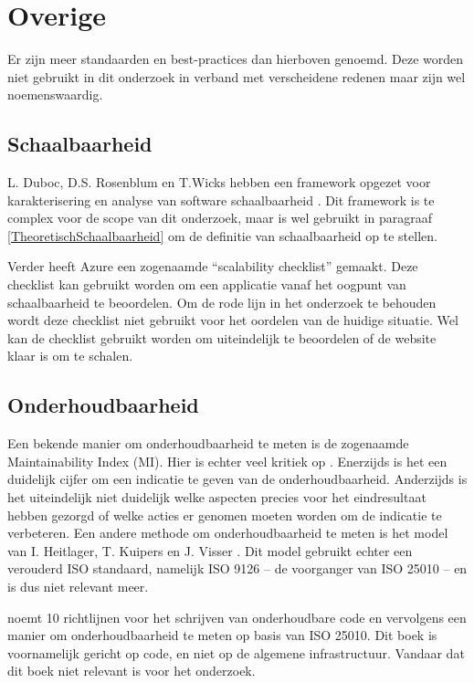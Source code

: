\section{Overige}

Er zijn meer standaarden en best-practices dan hierboven genoemd. Deze worden niet gebruikt in dit onderzoek in verband met verscheidene redenen maar zijn wel noemenswaardig.

\subsection{Schaalbaarheid}
L. Duboc, D.S. Rosenblum en T.Wicks hebben een framework opgezet voor karakterisering en analyse van software schaalbaarheid \parencite{ScalabilityFramework}. Dit framework is te complex voor de scope van dit onderzoek, maar is wel gebruikt in paragraaf \ref{TheoretischSchaalbaarheid} om de definitie van schaalbaarheid op te stellen.

Verder heeft Azure \parencite{AzureScalability} een zogenaamde \enquote{scalability checklist} gemaakt. Deze checklist kan gebruikt worden om een applicatie vanaf het oogpunt van schaalbaarheid te beoordelen. Om de rode lijn in het onderzoek te behouden wordt deze checklist niet gebruikt voor het oordelen van de huidige situatie. Wel kan de checklist gebruikt worden om uiteindelijk te beoordelen of de website klaar is om te schalen.

\subsection{Onderhoudbaarheid}
Een bekende manier om onderhoudbaarheid te meten is de zogenaamde Maintainability Index (MI). Hier is echter veel kritiek op \parencite{MaintainabilityLiteratureReview, WhyNoMI, WhyNoMI2, MeasuringMaintainability}. Enerzijds is het een duidelijk cijfer om een indicatie te geven van de onderhoudbaarheid. Anderzijds is het uiteindelijk niet duidelijk welke aspecten precies voor het eindresultaat hebben gezorgd of welke acties er genomen moeten worden om de indicatie te verbeteren. Een andere methode om onderhoudbaarheid te meten is het model van I. Heitlager, T. Kuipers en J. Visser \parencite{MeasuringMaintainability}. Dit model gebruikt echter een verouderd ISO standaard, namelijk ISO 9126 -- de voorganger van ISO 25010 -- en is dus niet relevant meer.

\parencite{MaintainableSoftware} noemt 10 richtlijnen voor het schrijven van onderhoudbare code en vervolgens een manier om onderhoudbaarheid te meten op basis van ISO 25010. Dit boek is voornamelijk gericht op code, en niet op de algemene infrastructuur. Vandaar dat dit boek niet relevant is voor het onderzoek.
 
